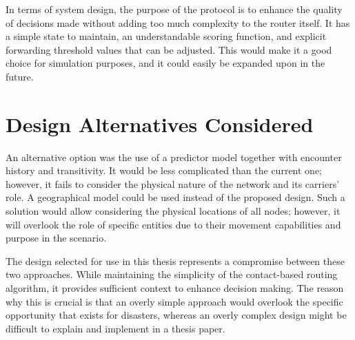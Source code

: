 In terms of system design, the purpose of the protocol is to enhance the quality of decisions made without adding too much complexity to the router itself. It has a simple state to maintain, an understandable scoring function, and explicit forwarding threshold values that can be adjusted. This would make it a good choice for simulation purposes, and it could easily be expanded upon in the future.

\section{Design Alternatives Considered}
An alternative option was the use of a predictor model together with encounter history and transitivity. It would be less complicated than the current one; however, it fails to consider the physical nature of the network and its carriers’ role. A geographical model could be used instead of the proposed design. Such a solution would allow considering the physical locations of all nodes; however, it will overlook the role of specific entities due to their movement capabilities and purpose in the scenario.

The design selected for use in this thesis represents a compromise between these two approaches. While maintaining the simplicity of the contact-based routing algorithm, it provides sufficient context to enhance decision making. The reason why this is crucial is that an overly simple approach would overlook the specific opportunity that exists for disasters, whereas an overly complex design might be difficult to explain and implement in a thesis paper.
